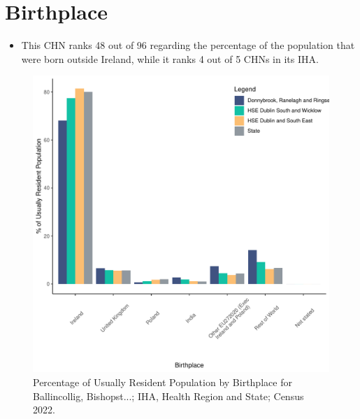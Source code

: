 \documentclass{article}
\begin{document}
\section{Birthplace}\label{sect:Birth}
\begin{itemize}
\item This CHN ranks  48 out of 96 regarding the percentage of the population that were born outside Ireland, while it ranks  4 out of 5 CHNs in its IHA.
\end{itemize}
\begin{figure}[H]
	\centering
	\includegraphics[width = 130mm]{../figures/BirthED.pdf}
	\caption{Percentage of Usually Resident Population by Birthplace for Ballincollig, Bishopst...; IHA, Health Region and State; Census 2022.}
	\label{fig:vbnv}
	\end{figure}
	
\end{document}
